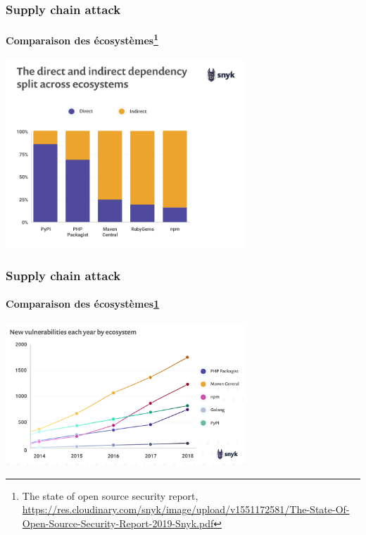 \documentclass{beamer}
\begin{document}
    \begin{frame}
        \frametitle{Supply chain attack}
        \framesubtitle{Comparaison des écosystèmes\footnote{\label{snyk}The state of open source security report, \url{https://res.cloudinary.com/snyk/image/upload/v1551172581/The-State-Of-Open-Source-Security-Report-2019-Snyk.pdf}}}
        \transdissolve
        \centering
        \includegraphics[width=9cm]{image/vuln-direct-indirect-dependencies}
    \end{frame}

    \begin{frame}
        \frametitle{Supply chain attack}
        \framesubtitle{Comparaison des écosystèmes\cref{snyk}}
        \transdissolve
        \centering
        \includegraphics[width=9cm]{image/vuln-created}
    \end{frame}
\end{document}
